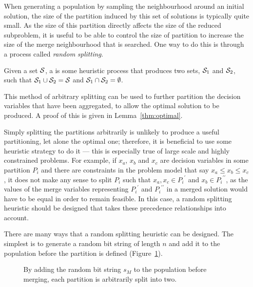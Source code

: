 \documentclass[journal]{IEEEtran}
\begin{document}
When generating a population by sampling the neighbourhood around an initial solution, the size of the partition induced by this set of solutions is typically quite small. As the size of this partition directly affects the size of the reduced subproblem, it is useful to be able to control the size of partition to increase the size of the merge neighbourhood that is searched. One way to do this is through a process called \emph{random splitting}. 
%
\begin{definition}\label{def:split}
Given a set $\S{S}$, a  is some heuristic process that produces two sets, $\S{S}_1$ and $\S{S}_2$, such that $\S{S}_1 \cup \S{S}_2 = \S{S}$ and $\S{S}_1 \cap \S{S}_2 = \emptyset$.
\end{definition}
%
This method of arbitrary splitting can be used to further partition the decision variables that have been aggregated, to allow the optimal solution to be produced. A proof of this is given in Lemma~\ref{thm:optimal}. 

Simply splitting the partitions arbitrarily is unlikely to produce a useful partitioning, let alone the optimal one; therefore, it is beneficial to use some heuristic strategy to do it --- this is especially true of large scale and highly constrained problems. For example, if $x_a$, $x_b$ and $x_c$ are decision variables in some partition $P_i$ and there are constraints in the problem model that say $x_a \leq x_b \leq x_c$, it does not make any sense to split $P_i$ such that $x_a,x_c \in {P_i}^\prime$ and $x_b \in {P_i}^{\prime\prime}$, as the values of the merge variables representing ${P_i}^\prime$ and ${P_i}^{\prime\prime}$ in a merged solution would have to be equal in order to remain feasible. In this case, a random splitting heuristic should be designed that takes these precedence relationships into account.

\medskip

There are many ways that a random splitting heuristic can be designed. The simplest is to generate a random bit string of length $n$ and add it to the population before the partition is defined (Figure~\ref{fig:random_split}). 

\begin{figure}[h]
\centering
{}
\caption[Splitting partitions by adding a random bit string]
       {By adding the random bit string $s_M$ to the population before merging, each partition is arbitrarily split into two.}
\label{fig:random_split}
\end{figure}
\end{document}
